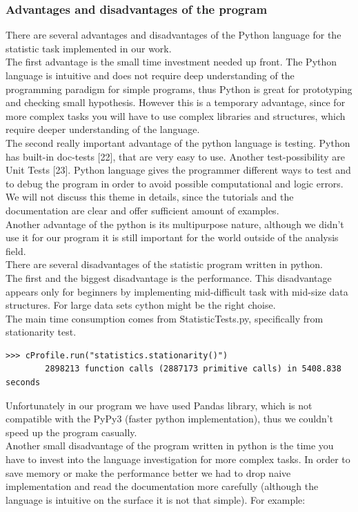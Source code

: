\documentclass{article}
\begin{document}
\subsubsection{Advantages and disadvantages of the program}
There are several advantages and disadvantages of the Python language for the statistic task implemented in our work.\\
The first advantage is the small time investment needed up front. The Python language is intuitive and does not require deep understanding of the programming paradigm for simple programs, thus Python is great for prototyping and checking small hypothesis. However this is a temporary advantage, since for more complex tasks you will have to use complex libraries and structures, which require deeper understanding of the language.\\
The second really important advantage of the python language is testing. Python has built-in doc-tests [22], that are very easy to use. Another test-possibility are Unit Tests [23]. Python language gives the programmer different ways to test and to debug the program in order to avoid possible computational and logic errors. We will not discuss this theme in details, since the tutorials and the documentation are clear and offer sufficient amount of examples.\\
Another advantage of the python is its multipurpose nature, although we didn't use it for our program it is still important for the world outside of the analysis field.\\
There are several disadvantages of the statistic program written in python.\\ 
The first and the biggest disadvantage is the performance. This disadvantage appears only for beginners by implementing mid-difficult task with mid-size data structures. For large data sets cython might be the right choise.\\
The main time consumption comes from StatisticTests.py, specifically from stationarity test. 
\begin{verbatim}
>>> cProfile.run("statistics.stationarity()")
        2898213 function calls (2887173 primitive calls) in 5408.838 seconds
\end{verbatim}
Unfortunately in our program we have used Pandas library, which is not compatible with the PyPy3 (faster python implementation), thus we couldn't speed up the program casually.\\
Another small disadvantage of the program written in python is the time you have to invest into the language investigation for more complex tasks. In order to save memory or make the performance better we had to drop naive implementation and read the documentation more carefully (although the language is intuitive on the surface it is not that simple). For example:
\end{document}

